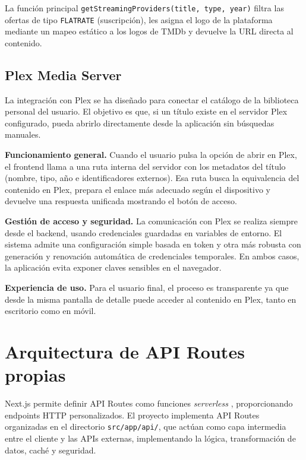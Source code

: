 La función principal \texttt{getStreamingProviders(title, type, year)} filtra las ofertas de tipo \texttt{FLATRATE} (suscripción), les asigna el logo de la plataforma mediante un mapeo estático a los logos de TMDb y devuelve la URL directa al contenido.

\subsection{Plex Media Server}

La integración con Plex se ha diseñado para conectar el catálogo de la biblioteca personal del usuario. El objetivo es que, si un título existe en el servidor Plex configurado, pueda abrirlo directamente desde la aplicación sin búsquedas manuales.

\textbf{Funcionamiento general.} Cuando el usuario pulsa la opción de abrir en Plex, el frontend llama a una ruta interna del servidor con los metadatos del título (nombre, tipo, año e identificadores externos). Esa ruta busca la equivalencia del contenido en Plex, prepara el enlace más adecuado según el dispositivo y devuelve una respuesta unificada mostrando el botón de acceso.

\textbf{Gestión de acceso y seguridad.} La comunicación con Plex se realiza siempre desde el backend, usando credenciales guardadas en variables de entorno. El sistema admite una configuración simple basada en token y otra más robusta con generación y renovación automática de credenciales temporales. En ambos casos, la aplicación evita exponer claves sensibles en el navegador.

\textbf{Experiencia de uso.} Para el usuario final, el proceso es transparente ya que desde la misma pantalla de detalle puede acceder al contenido en Plex, tanto en escritorio como en móvil.

\section{Arquitectura de API Routes propias}

Next.js permite definir API Routes como funciones \textit{serverless} \parencite{Vercel:2024b}, proporcionando endpoints HTTP personalizados. El proyecto implementa API Routes organizadas en el directorio \texttt{src/app/api/}, que actúan como capa intermedia entre el cliente y las APIs externas, implementando la lógica, transformación de datos, caché y seguridad.

